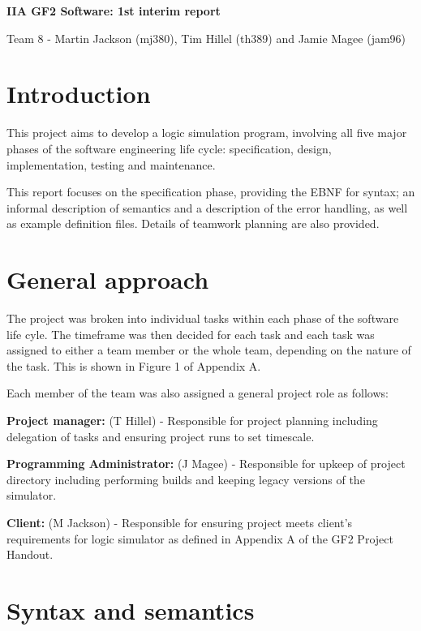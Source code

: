 \documentclass[a4paper,10pt]{article}
\begin{document}
\begin{center}
\LARGE \textbf{IIA GF2 Software: 1st interim report}

\small Team 8 - Martin Jackson (mj380), Tim Hillel (th389) and Jamie Magee (jam96)
\end{center}



\section{Introduction}

This project aims to develop a logic simulation program, involving all five major phases of the software engineering life cycle: specification, design, implementation, testing and maintenance.

This report focuses on the specification phase, providing the EBNF for syntax; an informal description of semantics and a description of the error handling, as well as example definition files.
Details of teamwork planning are also provided.

\section{General approach}

The project was broken into individual tasks within each phase of the software life cyle.
The timeframe was then decided for each task and each task was assigned to either a team member or the whole team, depending on the nature of the task.
This is shown in Figure 1 of Appendix A.

Each member of the team was also assigned a general project role as follows:

\textbf{Project manager:} (T Hillel) - Responsible for project planning including delegation of tasks and ensuring project runs to set timescale.

\textbf{Programming Administrator:} (J Magee) - Responsible for upkeep of project directory including performing builds and keeping legacy versions of the simulator.

\textbf{Client:} (M Jackson) - Responsible for ensuring project meets client's requirements for logic simulator as defined in Appendix A of the GF2 Project Handout.

\section{Syntax and semantics}
\end{document}
